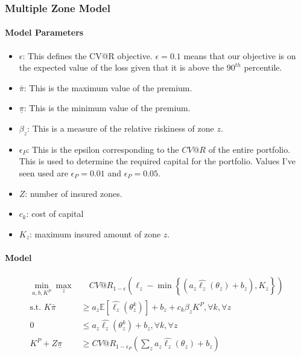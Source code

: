 \documentclass[11pt]{article}
\begin{document}
    \subsubsection*{Multiple Zone Model}
    \paragraph*{Model Parameters}
        \begin{itemize}
            \item $\epsilon$: This defines the CV@R objective. $\epsilon = 0.1$ means that our objective is on the expected value of the loss given that it is above the $90^{th}$ percentile. 
            \item $\bar{\pi}$: This is the maximum value of the premium. 
            \item $\underline{\pi}$: This is the minimum value of the premium. 
            \item $\beta_z$: This is a measure of the relative riskiness of zone $z$. 
            \item $\epsilon_P$: This is the epsilon corresponding to the $CV@R$ of the entire portfolio. This is used to determine the required capital for the portfolio. Values I've seen used are $\epsilon_P=0.01$ and $\epsilon_P=0.05$. 
            \item $Z$: number of insured zones.
            \item $c_k$: cost of capital
            \item $K_z$: maximum insured amount of zone $z$.  
        \end{itemize}
    
        \paragraph*{Model}
        
        \begin{align}
            \min_{a,b,K^P} \max_z &\quad CV@R_{1-\epsilon}(\ell_z - \min\left\{(a_z\hat{\ell_z}(\theta_z) + b_z), K_z\right\})\\
            \text{s.t.   } K\bar{\pi} &\geq a_z \mathbb{E}[\hat{\ell_z}(\theta^k_z)] + b_z + c_k\beta_z K^P,  \forall k, \forall z\\
            0 &\leq a_z\hat{\ell_z}(\theta^k_z) + b_z, \forall k, \forall z \\
            K^P + Z\underline{\pi} &\geq CV@R_{1-\epsilon_P}\left( \sum_z a_z \hat{\ell_z}(\theta_z) + b_z \right)
        \end{align}
        
\end{document}
